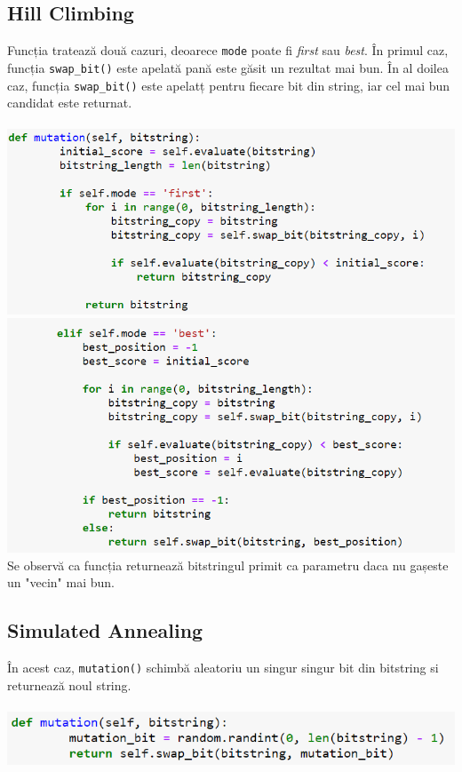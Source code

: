 \documentclass{article}
\begin{document}
\subsection*{Hill Climbing}
Funcția tratează două cazuri, deoarece \texttt{mode} poate fi \textit{first} sau \textit{best}. În primul caz, funcția \texttt{swap\_bit()} este apelată pană este găsit un rezultat mai bun. În al doilea caz, funcția \texttt{swap\_bit()} este apelatț pentru fiecare bit din string, iar cel mai bun candidat este returnat.\\\\
\includegraphics[width=\textwidth]{3d}
\includegraphics[width=\textwidth]{3e}\\
Se observă ca funcția returnează bitstringul primit ca parametru daca nu gașeste un "vecin" mai bun.
\subsection*{Simulated Annealing}
În acest caz, \texttt{mutation()} schimbă aleatoriu un singur singur bit din bitstring si returnează noul string.\\\\
\includegraphics[width=\textwidth]{3h}
\end{document}
